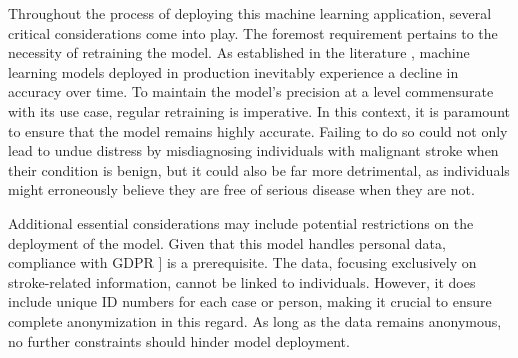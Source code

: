 Throughout the process of deploying this machine learning application, several critical considerations come into play. The foremost requirement pertains to the necessity of retraining the model. As established in the literature  \cite{talby-oreilly}, machine learning models deployed in production inevitably experience a decline in accuracy over time. To maintain the model's precision at a level commensurate with its use case, regular retraining is imperative. In this context, it is paramount to ensure that the model remains highly accurate. Failing to do so could not only lead to undue distress by misdiagnosing individuals with malignant stroke when their condition is benign, but it could also be far more detrimental, as individuals might erroneously believe they are free of serious disease when they are not.

Additional essential considerations may include potential restrictions on the deployment of the model. Given that this model handles personal data, compliance with GDPR \cite{gdpr-alchemer}] is a prerequisite. The data, focusing exclusively on stroke-related information, cannot be linked to individuals. However, it does include unique ID numbers for each case or person, making it crucial to ensure complete anonymization in this regard. As long as the data remains anonymous, no further constraints should hinder model deployment.



